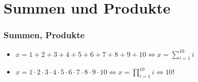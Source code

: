 \section{Summen und Produkte}
\begin{frame}
    \frametitle{Summen, Produkte}
    \begin{itemize}
        \item $x = 1+2+3+4+5+6+7+8+9+10 \iff x = \sum_{i=1}^{10} i$
        \item $x = 1 \cdot 2 \cdot 3 \cdot 4 \cdot 5 \cdot 6 \cdot 7 \cdot 8 \cdot 9 \cdot 10 \iff x = \prod_{i=1}^{10} i \iff 10!$
    \end{itemize}
\end{frame}

